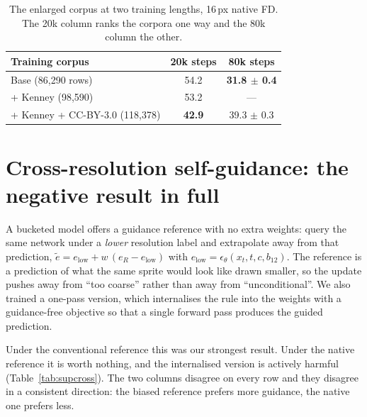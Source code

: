 \documentclass[10pt,twocolumn,letterpaper]{article}
\begin{document}
\begin{table}[h]
\caption{The enlarged corpus at two training lengths, 16\,px native FD. The 20k column ranks the corpora one way and
the 80k column the other.}
\label{tab:supdata}
\centering
\small
\begin{tabular}{@{}lcc@{}}
\toprule
Training corpus & 20k steps & 80k steps \\
\midrule
Base (86{,}290 rows)              & 54.2 & \textbf{31.8 $\pm$ 0.4} \\
{+ Kenney (98{,}590)}             & 53.2 & --- \\
{+ Kenney + CC-BY-3.0 (118{,}378)} & \textbf{42.9} & 39.3 $\pm$ 0.3 \\
\bottomrule
\end{tabular}
\end{table}

\section{Cross-resolution self-guidance: the negative result in full}
\label{sup:crossres}

A bucketed model offers a guidance reference with no extra weights: query the same network under a \emph{lower}
resolution label and extrapolate away from that prediction, $\tilde e = e_{\text{low}} + w\,(e_R - e_{\text{low}})$
with $e_{\text{low}} = \epsilon_\theta(x_t, t, c, b_{12})$. The reference is a prediction of what the same sprite would
look like drawn smaller, so the update pushes away from ``too coarse'' rather than away from ``unconditional''. We also
trained a one-pass version, which internalises the rule into the weights with a guidance-free objective so that a
single forward pass produces the guided prediction.

Under the conventional reference this was our strongest result. Under the native reference it is worth nothing, and
the internalised version is actively harmful (Table~\ref{tab:supcross}). The two columns disagree on every row and
they disagree in a consistent direction: the biased reference prefers more guidance, the native one prefers less.
\end{document}
